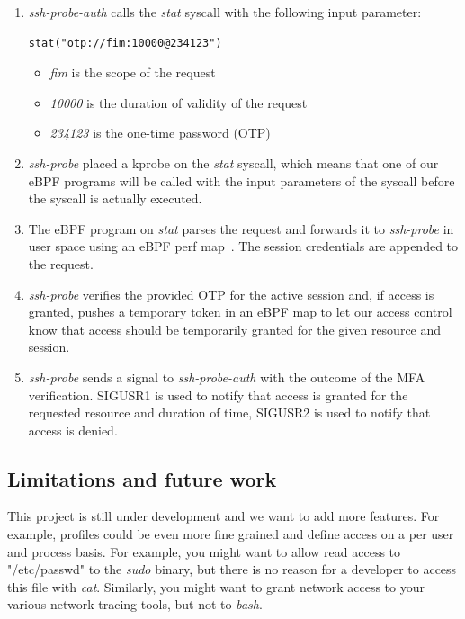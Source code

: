 \begin{enumerate}
  \item \emph{ssh-probe-auth} calls the \emph{stat} syscall with the following input parameter:
    \begin{lstlisting}[language={},caption={MFA \emph{stat} syscall},label={lst:MonitoringAndProtectingSSHSessionsWithEBPF:STAT}]
  stat("otp://fim:10000@234123")
    \end{lstlisting}
    \begin{itemize}
      \item \emph{fim} is the scope of the request
      \item \emph{10000} is the duration of validity of the request
      \item \emph{234123} is the one-time password (OTP)
    \end{itemize}
  \item \emph{ssh-probe} placed a kprobe on the \emph{stat} syscall, which means that one of our eBPF programs will be called with the input parameters of the syscall before the syscall is actually executed.
  \item The eBPF program on \emph{stat} parses the request and forwards it to \emph{ssh-probe} in user space using an eBPF perf map~\cite{MonitoringAndProtectingSSHSessionsWithEBPF:LorenzoDavid}.
  The session credentials are appended to the request.
  \item \emph{ssh-probe} verifies the provided OTP for the active session and, if access is granted, pushes a temporary token in an eBPF map to let our access control know that access should be temporarily granted for the given resource and session.
  \item \emph{ssh-probe} sends a signal to \emph{ssh-probe-auth} with the outcome of the MFA verification.
  SIGUSR1 is used to notify that access is granted for the requested resource and duration of time, SIGUSR2 is used to notify that access is denied.
\end{enumerate}

\subsection{Limitations and future work}

This project is still under development and we want to add more features.
For example, profiles could be even more fine grained and define access on a per user and process basis.
For example, you might want to allow read access to "/etc/passwd" to the \emph{sudo} binary, but there is no reason for a developer to access this file with \emph{cat}.
Similarly, you might want to grant network access to your various network tracing tools, but not to \emph{bash}.


